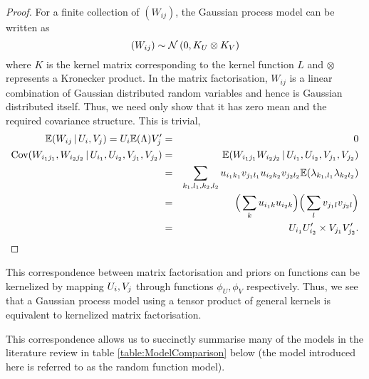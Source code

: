 \begin{proof}
For a finite collection of $(W_{ij})$, the Gaussian process model can be written as
\begin{equation}
(W_{ij}) \sim \mathcal{N}\,(0, K_U \otimes K_V)
\end{equation}
where $K$ is the kernel matrix corresponding to the kernel function $L$ and $\otimes$ represents a Kronecker product.
In the matrix factorisation, $W_{ij}$ is a linear combination of Gaussian distributed random variables and hence is Gaussian distributed itself. Thus, we need only show that it has zero mean and the required covariance structure. This is trivial,
\begin{eqnarray}
\mathbb{E} (W_{ij} \,|\, U_i, V_j) = U_i\mathbb{E}(\Lambda)V_j' & = & 0 \\
\textrm{Cov} (W_{i_1j_1}, W_{i_2j_2} \,|\, U_{i_1}, U_{i_2}, V_{j_1}, V_{j_2}) & = & \mathbb{E} (W_{i_1j_1} W_{i_2j_2} \,|\, U_{i_1}, U_{i_2}, V_{j_1}, V_{j_2} ) \nonumber \\
& = & \sum_{k_1,l_1,k_2,l_2} u_{i_1k_1}v_{j_1l_1}u_{i_2k_2}v_{j_2l_2}\mathbb{E}(\lambda_{k_1,l_1}\lambda_{k_2l_2}) \nonumber \\
& = & \Big(\sum_k u_{i_1k}u_{i_2k}\Big)\Big(\sum_l v_{j_1l}v_{j_2l}\Big) \nonumber \\
& = & U_{i_1}U_{i_2}' \times V_{j_1}V_{j_2}'.
\end{eqnarray}
\end{proof}

This correspondence between matrix factorisation and priors on functions can be kernelized by mapping $U_i, V_j$ through functions $\phi_U, \phi_V$ respectively.
Thus, we see that a Gaussian process model using a tensor product of general kernels is equivalent to kernelized matrix factorisation.

This correspondence allows us to succinctly summarise many of the models in the literature review in table \ref{table:ModelComparison} below (the model introduced here is referred to as the random function model).

